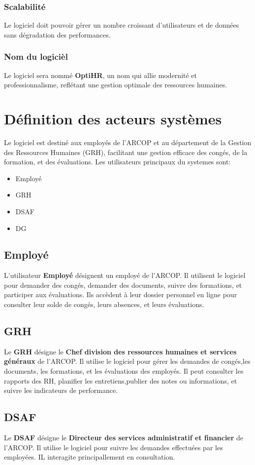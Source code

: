 \subsubsection{Scalabilité}
Le logiciel doit pouvoir gérer un nombre croissant d'utilisateurs et de données sans dégradation des performances.


\subsubsection{Nom du logicièl}
Le logiciel sera nommé \textbf{OptiHR}, un nom qui allie modernité et professionnalisme, reflétant une gestion
optimale des ressources humaines.


\section{Définition des acteurs systèmes}
Le logiciel est destiné aux employés de l’\ac{ARCOP} et au département de la Gestion des Ressources Humaines (GRH), facilitant une gestion efficace des congés, de la formation, et des évaluations.
Les utilisateurs principaux du systemes sont:
\begin{itemize}
    \item Employé 
    \item GRH 
    \item DSAF 
    \item DG 
\end{itemize}
\subsection{Employé}
L'utilisateur \textbf{Employé} désignent un employé de l'\ac{ARCOP}. Il utilisent le logiciel pour demander des congés, demander des documents, suivre des formations, et participer aux évaluations. Ils accèdent à leur dossier personnel en ligne pour consulter leur solde de congés, leurs absences, et leurs évaluations.
\subsection{GRH}
Le \textbf{GRH} désigne le \textbf{Chef division des ressources humaines et services généraux} de l'\ac{ARCOP}. Il utilise le logiciel pour gérer les demandes de congés,les documents, les formations, et les évaluations des employés. Il peut consulter les rapports des \ac{RH}, planifier les entretiens,publier des notes ou informations, et suivre les indicateurs de performance.
\subsection{DSAF }
Le \textbf{DSAF} désigne le \textbf{ Directeur des services administratif et financier} de l'\ac{ARCOP}. Il utilise le logiciel pour suivre les demandes effectuées par les employées. IL interagite principallement en consultation.

